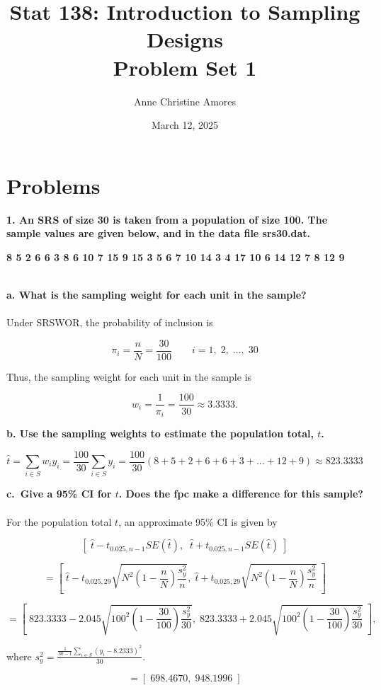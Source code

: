 \documentclass[12pt]{article}
\title{Stat 138: Introduction to Sampling Designs \\ Problem Set 1}
\author{Anne Christine Amores}
\date{March 12, 2025}
\begin{document}
\maketitle

\section{Problems}

\textbf{1. An SRS of size 30 is taken from a population of size
100. The sample values are given below, and in the data file
srs30.dat.}

\begin{center}
\textbf{8 5 2 6 6 3 8 6 10 7 15 9 15 3 5 6 7 10 14 3 4 17 10 6 14 12 7 8 12 9}
\end{center}
\\
\textbf{a. What is the sampling weight for each unit in the sample?} \\
\\
Under SRSWOR, the probability of inclusion is

\[
\pi_i = \frac{n}{N} = \frac{30}{100} \quad \quad i = 1,\;2,\;...,\;30
\]

Thus, the sampling weight for each unit in the sample is

\[
w_i = \frac{1}{\pi_i} = \frac{100}{30} \approx \boxed{3.3333}.
\]

\textbf{b. Use the sampling weights to estimate the population total, \(t\).} 

\[
\hat t = \sum_{i \in S}{w_iy_i} = \frac{100}{30}\sum_{i \in S}{y_i} = \frac{100}{30}(8+5+2+6+6+3+...+12+9) \approx \boxed{823.3333}
\]

\textbf{c.~Give a 95\% CI for \(t\). Does the fpc make a difference for this
sample?} \\
\\
For the population total \(t\), an approximate 95\% CI is given by

\[
\left[\;\hat t- t_{0.025,n-1}SE(\hat t),\;\;\hat t +t_{0.025,n-1}SE(\hat t)\;\right]
\]

\[
= \left[\;\hat t- t_{0.025,29}\sqrt{N^2(1-\frac{n}{N})\frac{s_y^2}n},\;\hat t +t_{0.025,29}\sqrt{N^2(1-\frac{n}{N})\frac{s_y^2}n}\;\right]
\]

\[
= \left[\;823.3333- 2.045\sqrt{100^2(1-\frac{30}{100})\frac{s_y^2}{30}},\;823.3333 +2.045\sqrt{100^2(1-\frac{30}{100})\frac{s_y^2}{30}}\;\right],
\]
\begin{center}
where $s_y^2 =\frac{\frac{1}{30-1}\sum_{i \in S}{(y_i-8.2333)^2}}{30}$.
\end{center}
\[
= \boxed{\left[\;698.4670,\;948.1996\;\right]}
\]
\end{document}
